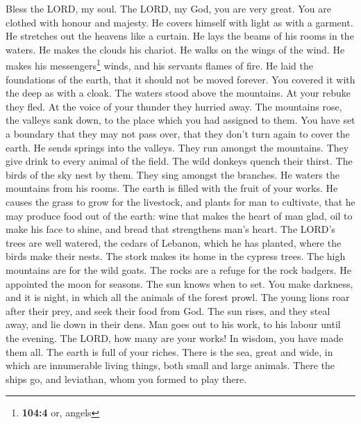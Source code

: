  Bless the LORD, my soul. The LORD, my God, you are very
great. You are clothed with honour and majesty.  He covers
himself with light as with a garment. He stretches out the heavens like
a curtain.  He lays the beams of his rooms in the waters.
He makes the clouds his chariot. He walks on the wings of the wind.
 He makes his messengers\footnote{\textbf{104:4} or,
  angels} winds, and his servants flames of fire.  He laid
the foundations of the earth, that it should not be moved forever.
 You covered it with the deep as with a cloak. The waters
stood above the mountains.  At your rebuke they fled. At
the voice of your thunder they hurried away.  The
mountains rose, the valleys sank down, to the place which you had
assigned to them.  You have set a boundary that they may
not pass over, that they don't turn again to cover the earth.
 He sends springs into the valleys. They run amongst the
mountains.  They give drink to every animal of the field.
The wild donkeys quench their thirst.  The birds of the
sky nest by them. They sing amongst the branches.  He
waters the mountains from his rooms. The earth is filled with the fruit
of your works.  He causes the grass to grow for the
livestock, and plants for man to cultivate, that he may produce food out
of the earth:  wine that makes the heart of man glad, oil
to make his face to shine, and bread that strengthens man's heart.
 The LORD's trees are well watered, the cedars of
Lebanon, which he has planted,  where the birds make
their nests. The stork makes its home in the cypress trees.
 The high mountains are for the wild goats. The rocks are
a refuge for the rock badgers.  He appointed the moon for
seasons. The sun knows when to set.  You make darkness,
and it is night, in which all the animals of the forest prowl.
 The young lions roar after their prey, and seek their
food from God.  The sun rises, and they steal away, and
lie down in their dens.  Man goes out to his work, to his
labour until the evening.  The LORD, how many are your
works! In wisdom, you have made them all. The earth is full of your
riches.  There is the sea, great and wide, in which are
innumerable living things, both small and large animals. 
There the ships go, and leviathan, whom you formed to play there.
